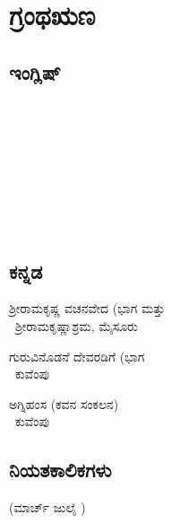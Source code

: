 
\chapter*{ಗ್ರಂಥಋಣ}

\section*{ಇಂಗ್ಲಿಷ್}

\begin{thebibliography}{99}
 \\\phantom{i}~\hfill{}

  \\\phantom{i}~\hfill{}

  \\\phantom{i}~\hfill {}

 \end{thebibliography}


\section*{ಕನ್ನಡ}

\begin{thebibliography}{99}
 ಶ್ರೀರಾಮಕೃಷ್ಣ ವಚನವೇದ (ಭಾಗ  ಮತ್ತು \\\phantom{i}~\hfill ಶ್ರೀರಾಮಕೃಷ್ಣಾಶ್ರಮ, ಮೈಸೂರು

  ಗುರುವಿನೊಡನೆ ದೇವರಡಿಗೆ (ಭಾಗ \\\phantom{i}~\hfill ಕುವೆಂಪು

  ಅಗ್ನಿಹಂಸ (ಕವನ ಸಂಕಲನ)\\\phantom{i}~\hfill ಕುವೆಂಪು

 \end{thebibliography}


\section*{ನಿಯತಕಾಲಿಕಗಳು}

\begin{thebibliography}{99}
 (ಮಾರ್ಚ್  ಜುಲೈ )\\\phantom{i}~\hfill {}

 \end{thebibliography}

